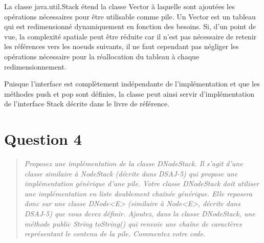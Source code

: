 \documentclass[11pt,a4paper]{article}
\begin{document}
La classe java.util.Stack étend la classe Vector à laquelle sont ajoutées les opérations nécessaires pour être utilisable comme pile. Un Vector est un tableau qui est redimensionné dynamiquement en fonction des besoins. Si, d'un point de vue, la complexité spatiale peut être réduite car il n'est pas nécessaire de retenir les références vers les noeuds suivants, il ne faut cependant pas négliger les opérations nécessaire pour la réallocation du tableau à chaque redimensionnement. 

Puisque l'interface est complètement indépendante de l'implémentation et que les méthodes push et pop sont définies, la classe peut ainsi servir d'implémentation de l'interface Stack décrite dans le livre de référence.

\section{Question 4}
\begin{quotation}
\textit{Proposez une implémentation de la classe DNodeStack. Il s’agit d’une classe
similaire à NodeStack (décrite dans DSAJ-5) qui propose une implémentation
générique d’une pile. Votre classe DNodeStack doit utiliser une implémentation en liste doublement chaînée générique. Elle reposera donc sur une classe
DNode<E> (similaire à Node<E>, décrite dans DSAJ-5) que vous devez définir.
Ajoutez, dans la classe DNodeStack, une méthode public String toString()
qui renvoie une chaîne de caractères représentant le contenu de la pile. Commentez votre code.}
\end{quotation}


\end{document}
